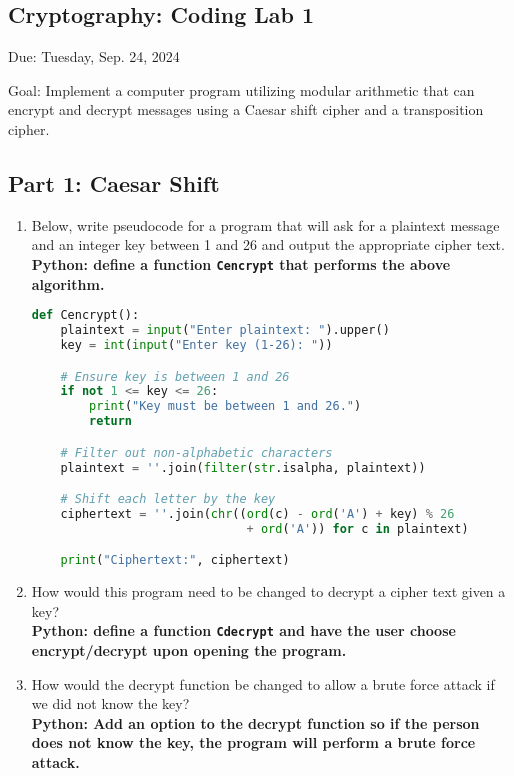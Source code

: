 \documentclass[11pt]{article}
\begin{document}
\begin{center}
    \section*{Cryptography: Coding Lab 1}

    \large{Due: Tuesday, Sep. 24, 2024}
\end{center}
Goal: Implement a computer program utilizing modular arithmetic that can encrypt and decrypt messages using a Caesar shift cipher and a transposition cipher.
\subsection*{Part 1: Caesar Shift}

\begin{enumerate}
\item	Below, write pseudocode for a program that will ask for a plaintext message and an integer key between 1 and 26 and output the appropriate cipher text. \\
\textbf{Python: define a function \texttt{Cencrypt} that performs the above algorithm.}

\begin{lstlisting}[language=Python]
def Cencrypt():
    plaintext = input("Enter plaintext: ").upper()
    key = int(input("Enter key (1-26): "))

    # Ensure key is between 1 and 26
    if not 1 <= key <= 26:
        print("Key must be between 1 and 26.")
        return

    # Filter out non-alphabetic characters
    plaintext = ''.join(filter(str.isalpha, plaintext))

    # Shift each letter by the key
    ciphertext = ''.join(chr((ord(c) - ord('A') + key) % 26 
                              + ord('A')) for c in plaintext)

    print("Ciphertext:", ciphertext)
\end{lstlisting}





\item	How would this program need to be changed to decrypt a cipher text given a key? \\
\textbf{Python: define a function \texttt{Cdecrypt} and have the user choose encrypt/decrypt upon opening the program.}

\item	How would the decrypt function be changed to allow a brute force attack if we did not know the key? \\
\textbf{Python: Add an option to the decrypt function so if the person does not know the key, the program will perform a brute force attack.}


\end{enumerate}
\end{document}
